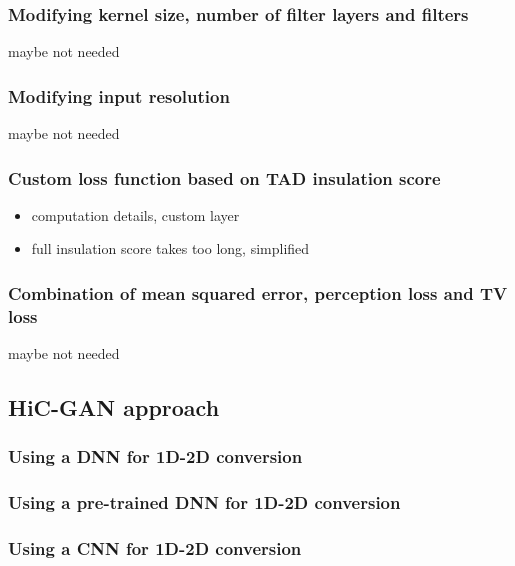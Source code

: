 \subsubsection{Modifying kernel size, number of filter layers and filters}
maybe not needed
\subsubsection{Modifying input resolution}
maybe not needed

\subsubsection{Custom loss function based on TAD insulation score}
\begin{itemize}
 \item computation details, custom layer
 \item full insulation score takes too long, simplified
\end{itemize}

\subsubsection{Combination of mean squared error, perception loss and TV loss}
maybe not needed

\subsection{HiC-GAN approach}
\subsubsection{Using a DNN for 1D-2D conversion}
\subsubsection{Using a pre-trained DNN for 1D-2D conversion}
\subsubsection{Using a CNN for 1D-2D conversion}








